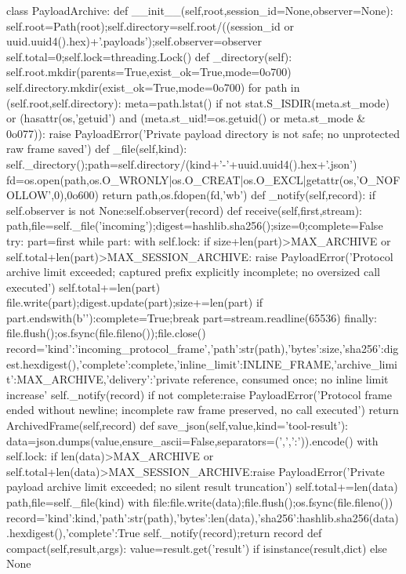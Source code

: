 class PayloadArchive:
 def __init__(self,root,session_id=None,observer=None):
  self.root=Path(root);self.directory=self.root/((session_id or uuid.uuid4().hex)+'.payloads');self.observer=observer
  self.total=0;self.lock=threading.Lock()
 def _directory(self):
  self.root.mkdir(parents=True,exist_ok=True,mode=0o700)
  self.directory.mkdir(exist_ok=True,mode=0o700)
  for path in (self.root,self.directory):
   meta=path.lstat()
   if not stat.S_ISDIR(meta.st_mode) or (hasattr(os,'getuid') and (meta.st_uid!=os.getuid() or meta.st_mode & 0o077)):
    raise PayloadError('Private payload directory is not safe; no unprotected raw frame saved')
 def _file(self,kind):
  self._directory();path=self.directory/(kind+'-'+uuid.uuid4().hex+'.json')
  fd=os.open(path,os.O_WRONLY|os.O_CREAT|os.O_EXCL|getattr(os,'O_NOFOLLOW',0),0o600)
  return path,os.fdopen(fd,'wb')
 def _notify(self,record):
  if self.observer is not None:self.observer(record)
 def receive(self,first,stream):
  path,file=self._file('incoming');digest=hashlib.sha256();size=0;complete=False
  try:
   part=first
   while part:
    with self.lock:
     if size+len(part)>MAX_ARCHIVE or self.total+len(part)>MAX_SESSION_ARCHIVE:
      raise PayloadError('Protocol archive limit exceeded; captured prefix explicitly incomplete; no oversized call executed')
     self.total+=len(part)
    file.write(part);digest.update(part);size+=len(part)
    if part.endswith(b'\n'):complete=True;break
    part=stream.readline(65536)
  finally:
   file.flush();os.fsync(file.fileno());file.close()
   record={'kind':'incoming_protocol_frame','path':str(path),'bytes':size,'sha256':digest.hexdigest(),'complete':complete,'inline_limit':INLINE_FRAME,'archive_limit':MAX_ARCHIVE,'delivery':'private reference, consumed once; no inline limit increase'}
   self._notify(record)
  if not complete:raise PayloadError('Protocol frame ended without newline; incomplete raw frame preserved, no call executed')
  return ArchivedFrame(self,record)
 def save_json(self,value,kind='tool-result'):
  data=json.dumps(value,ensure_ascii=False,separators=(',',':')).encode()
  with self.lock:
   if len(data)>MAX_ARCHIVE or self.total+len(data)>MAX_SESSION_ARCHIVE:raise PayloadError('Private payload archive limit exceeded; no silent result truncation')
   self.total+=len(data)
  path,file=self._file(kind)
  with file:file.write(data);file.flush();os.fsync(file.fileno())
  record={'kind':kind,'path':str(path),'bytes':len(data),'sha256':hashlib.sha256(data).hexdigest(),'complete':True}
  self._notify(record);return record
 def compact(self,result,args):
  value=result.get('result') if isinstance(result,dict) else None
